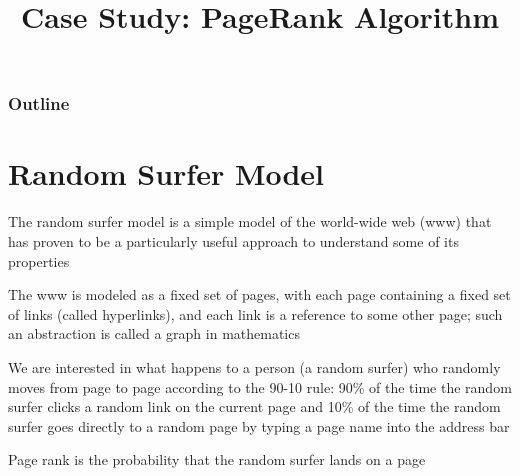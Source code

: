 \documentclass[8pt,a4paper,compress]{beamer}
\title{Case Study: PageRank Algorithm}
\date{}
\begin{document}
\begin{frame}
\vfill
\titlepage
\end{frame}

\begin{frame}
\frametitle{Outline}
\tableofcontents
\end{frame}

\section{Random Surfer Model}
\begin{frame}[fragile]
\pause

The random surfer model is a simple model of the world-wide web (www) that has proven to be a particularly useful approach to understand some of its properties

\pause
\bigskip

The www is modeled as a fixed set of pages, with each page containing a fixed set of links (called hyperlinks), and each link is a reference to some other page; such an abstraction is called a graph in mathematics

\pause
\bigskip

We are interested in what happens to a person (a random surfer) who randomly moves from page to page according to the 90-10 rule: 90\% of the time the random surfer clicks a random link on the current page and 10\% of the time the random surfer goes directly to a random page by typing a page name into the address bar

\pause
\bigskip

Page rank is the probability that the random surfer lands on a page
\end{frame}
\end{document}
